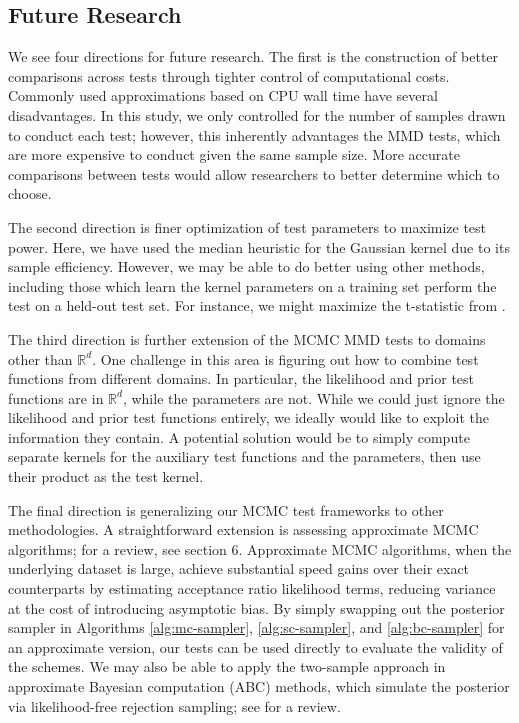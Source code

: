 \documentclass[a4paper,11pt]{article}
\begin{document}
\subsection{Future Research}
We see four directions for future research. The first is the construction of better comparisons across tests through tighter control of computational costs. Commonly used approximations based on CPU wall time have several disadvantages. In this study, we only controlled for the number of samples drawn to conduct each test; however, this inherently advantages the MMD tests, which are more expensive to conduct given the same sample size. More accurate comparisons between tests would allow researchers to better determine which to choose.

The second direction is finer optimization of test parameters to maximize test power. Here, we have used the median heuristic for the Gaussian kernel due to its sample efficiency. However, we may be able to do better using other methods, including those which learn the kernel parameters on a training set perform the test on a held-out test set. For instance, we might maximize the t-statistic from \cite{sutherland_generative_2019}.

The third direction is further extension of the MCMC MMD tests to domains other than $\mathbb{R}^{d}$. One challenge in this area is figuring out how to combine test functions from different domains. In particular, the likelihood and prior test functions are in $\mathbb{R}^{d}$, while the parameters are not. While we could just ignore the likelihood and prior test functions entirely, we ideally would like to exploit the information they contain. A potential solution would be to simply compute separate kernels for the auxiliary test functions and the parameters, then use their product as the test kernel.

The final direction is generalizing our MCMC test frameworks to other methodologies. A straightforward extension is assessing approximate MCMC algorithms; for a review, see \cite{bardenet_markov_2015} section 6. Approximate MCMC algorithms, when the underlying dataset is large, achieve substantial speed gains over their exact counterparts by estimating acceptance ratio likelihood terms, reducing variance at the cost of introducing asymptotic bias. By simply swapping out the posterior sampler in Algorithms \ref{alg:mc-sampler}, \ref{alg:sc-sampler}, and \ref{alg:bc-sampler} for an approximate version, our tests can be used directly to evaluate the validity of the schemes. We may also be able to apply the two-sample approach in approximate Bayesian computation (ABC) methods, which simulate the posterior via likelihood-free rejection sampling; see \cite{grazian_review_2020} for a review.



\end{document}
